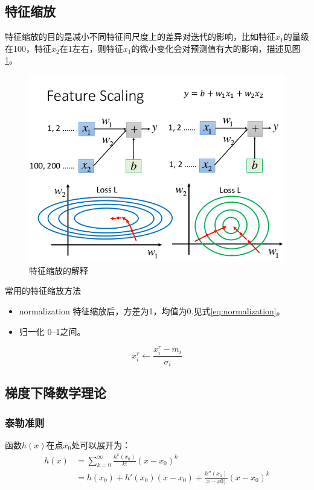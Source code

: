 \subsection{特征缩放}
特征缩放的目的是减小不同特征间尺度上的差异对迭代的影响，比如特征$x_1$的量级在100，特征$x_2$在1左右，则特征$x_1$的微小变化会对预测值有大的影响，描述见图\ref{fig:feature_scaling}。
\begin{figure}
	\centering
	\includegraphics[scale=0.5]{pic/feature_scaling}
	\caption{特征缩放的解释}
	\label{fig:feature_scaling}
\end{figure}

常用的特征缩放方法
\begin{itemize}
	\item normalization 特征缩放后，方差为1，均值为0.见式\eqref{eq:normalization}。
	\item 归一化 0--1之间。
\end{itemize}

\begin{equation}\label{eq:normalization}
x _ { i } ^ { r } \leftarrow \frac { x _ { i } ^ { r } - m _ { i } } { \sigma _ { i } }
\end{equation}
\subsection{梯度下降数学理论}
\subsubsection{泰勒准则}
函数$h(x)$在点$x_0$处可以展开为：
\begin{align*}
h(x) &= \sum_{k=0}^{\infty}\frac{h^k(x_0)}{k!}(x-x_0)^k\\
	&=h(x_0) + h'(x_0)(x-x_0) + \frac{h''(x_0)}{x-x0)}(x-x_0)^k
\end{align*}
